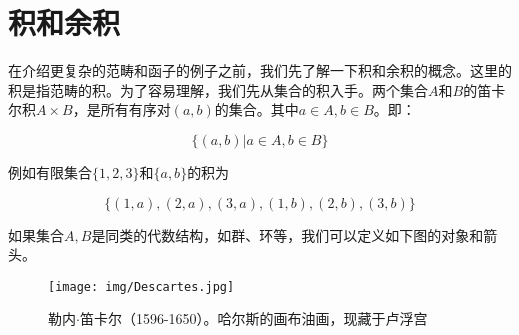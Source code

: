 \documentclass{article}
\begin{document}
\begin{Exercise}
\end{Exercise}

\section{积和余积}

在介绍更复杂的范畴和函子的例子之前，我们先了解一下积和余积的概念。这里的积是指范畴的积。为了容易理解，我们先从集合的积入手。两个集合$A$和$B$的笛卡尔积$A \times B$，是所有有序对$(a, b)$的集合。其中$a \in A, b \in B$。即：

\[
\{(a, b) | a \in A, b \in B\}
\]

例如有限集合$\{1, 2, 3\}$和$\{a, b\}$的积为

\[
\{(1, a), (2, a), (3, a), (1, b), (2, b), (3, b)\}
\]

如果集合$A, B$是同类的代数结构，如群、环等，我们可以定义如下图的对象和箭头。

\begin{center}
\end{center}

\begin{figure}[htbp]
 \centering
 \texttt{[image: img/Descartes.jpg]}
 \captionsetup{labelformat=empty}
 \caption{勒内$\cdot$笛卡尔（1596-1650）。哈尔斯的画布油画，现藏于卢浮宫}
 \label{fig:Decartes}
\end{figure}
\end{document}
